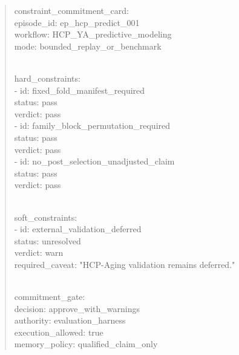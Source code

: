 \begin{quote}
constraint\_\allowbreak{}commitment\_\allowbreak{}card:\\
episode\_\allowbreak{}id: ep\_\allowbreak{}hcp\_\allowbreak{}predict\_\allowbreak{}001\\
workflow: HCP\_\allowbreak{}YA\_\allowbreak{}predictive\_\allowbreak{}modeling\\
mode: bounded\_\allowbreak{}replay\_\allowbreak{}or\_\allowbreak{}benchmark\\
\strut \\
hard\_\allowbreak{}constraints:\\
- id: fixed\_\allowbreak{}fold\_\allowbreak{}manifest\_\allowbreak{}required\\
status: pass\\
verdict: pass\\
- id: family\_\allowbreak{}block\_\allowbreak{}permutation\_\allowbreak{}required\\
status: pass\\
verdict: pass\\
- id: no\_\allowbreak{}post\_\allowbreak{}selection\_\allowbreak{}unadjusted\_\allowbreak{}claim\\
status: pass\\
verdict: pass\\
\strut \\
soft\_\allowbreak{}constraints:\\
- id: external\_\allowbreak{}validation\_\allowbreak{}deferred\\
status: unresolved\\
verdict: warn\\
required\_\allowbreak{}caveat: "HCP-Aging validation remains deferred."\\
\strut \\
commitment\_\allowbreak{}gate:\\
decision: approve\_\allowbreak{}with\_\allowbreak{}warnings\\
authority: evaluation\_\allowbreak{}harness\\
execution\_\allowbreak{}allowed: true\\
memory\_\allowbreak{}policy: qualified\_\allowbreak{}claim\_\allowbreak{}only


\end{quote}
